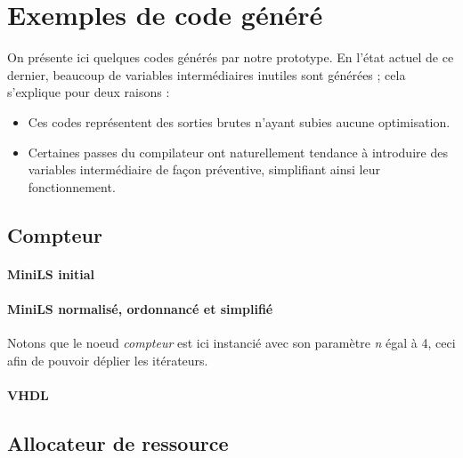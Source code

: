 \documentclass[a4paper]{article}
\begin{document}
\newpage
\tableofcontents

\newpage



\newpage
\appendix


\section{Exemples de code généré}

On présente ici quelques codes générés par notre prototype. En l'état
actuel de ce dernier, beaucoup de variables intermédiaires inutiles sont
générées ; cela s'explique pour deux raisons :

\begin{itemize}
\item Ces codes représentent des sorties brutes n'ayant subies aucune
  optimisation.
\item Certaines passes du compilateur ont naturellement tendance à introduire
  des variables intermédiaire de fa\c{c}on préventive, simplifiant ainsi leur
  fonctionnement.
\end{itemize}

\subsection{Compteur}

\paragraph{MiniLS initial}

\small

\normalsize

\paragraph{MiniLS normalisé, ordonnancé et simplifié}

Notons que le noeud \textit{compteur} est ici instancié avec son paramètre
\textit{n} égal à 4, ceci afin de pouvoir déplier les itérateurs.

\small

\normalsize

\paragraph{VHDL}

\small

\normalsize

\subsection{Allocateur de ressource}
\end{document}
